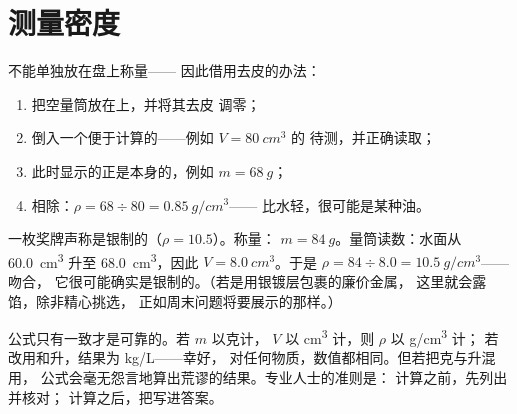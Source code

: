 \section{测量密度}

\begin{method}[液体的密度]\label{met:g7:volume-mass-density:liquid}
不能单独放在盘上称量——
因此借用去皮的办法：
\begin{enumerate}
  \item 把空量筒放在上，并将其去皮
        调零；
  \item 倒入一个便于计算的——例如 $V = \qty{80}{cm^3}$ 的
        待测，并正确读取；
  \item 此时显示的正是本身的，例如
        $m = \qty{68}{g}$；
  \item 相除：$\rho = 68 \div 80 = \qty{0.85}{g/cm^3}$——
        比水轻，很可能是某种油。
\end{enumerate}
\end{method}

\begin{example}\label{ex:g7:volume-mass-density:solid}
一枚奖牌声称是银制的（$\rho = 10.5$）。称量：
$m = \qty{84}{g}$。量筒读数：水面从 \qty{60.0}{cm^3} 升至
\qty{68.0}{cm^3}，因此 $V = \qty{8.0}{cm^3}$。于是
$\rho = 84 \div 8.0 = \qty{10.5}{g/cm^3}$——吻合，
它很可能确实是银制的。（若是用银镀层包裹的廉价金属，
这里就会露馅，除非精心挑选，
正如周末问题将要展示的那样。）
\end{example}

\begin{remark}[公式中的单位]\label{rem:g7:volume-mass-density:units}
公式只有一致才是可靠的。若 $m$ 以克计，
$V$ 以 \unit{cm^3} 计，则 $\rho$ 以 \unit{g/cm^3} 计；
若改用和升，结果为 \unit{kg/L}——幸好，
对任何物质，数值都相同。但若把克与升混用，
公式会毫无怨言地算出荒谬的结果。专业人士的准则是：
计算之前，先列出并核对；
计算之后，把写进答案。
\end{remark}

